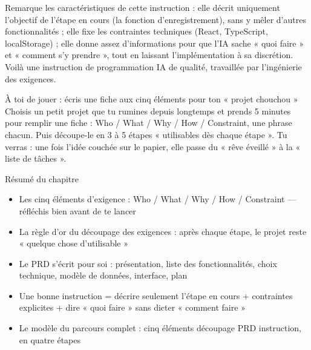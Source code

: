 Remarque les caractéristiques de cette instruction : elle décrit uniquement l'objectif de l'étape en cours (la fonction d'enregistrement), sans y mêler d'autres fonctionnalités ; elle fixe les contraintes techniques (React, TypeScript, localStorage) ; elle donne assez d'informations pour que l'IA sache « quoi faire » et « comment s'y prendre », tout en laissant l'implémentation à sa discrétion. Voilà une instruction de programmation IA de qualité, travaillée par l'ingénierie des exigences.

\begin{tcbpractice}{À toi de jouer : écris une fiche aux cinq éléments pour ton « projet chouchou »}
Choisis un petit projet que tu rumines depuis longtemps et prends 5 minutes pour remplir une fiche : Who / What / Why / How / Constraint, une phrase chacun. Puis découpe-le en 3 à 5 étapes « utilisables dès chaque étape ». Tu verras : une fois l'idée couchée sur le papier, elle passe du « rêve éveillé » à la « liste de tâches ».

\end{tcbpractice}

\begin{tcbsummary}{Résumé du chapitre}
\begin{itemize}
  \item Les cinq éléments d'exigence : Who / What / Why / How / Constraint — réfléchis bien avant de te lancer
  \item La règle d'or du découpage des exigences : après chaque étape, le projet reste « quelque chose d'utilisable »
  \item Le PRD s'écrit pour soi : présentation, liste des fonctionnalités, choix technique, modèle de données, interface, plan
  \item Une bonne instruction = décrire seulement l'étape en cours + contraintes explicites + dire « quoi faire » sans dicter « comment faire »
  \item Le modèle du parcours complet : cinq éléments découpage PRD instruction, en quatre étapes
\end{itemize}

\end{tcbsummary}
